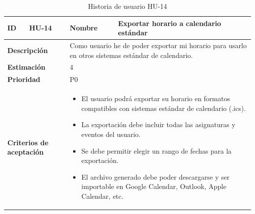 \begin{table}[H]
    \centering
    \begin{tabular}{|p{2cm}|p{4cm}|p{2cm}|p{4cm}|}
        \hline
        \textbf{ID} & HU-14 & \textbf{Nombre} & Exportar horario a calendario estándar \\
        \hline
        \multicolumn{2}{|p{6cm}|}{\textbf{Descripción}} & \multicolumn{2}{p{6cm}|}{Como usuario he de poder exportar mi horario para usarlo en otros sistemas estándar de calendario.} \\
        \hline
        \multicolumn{2}{|p{6cm}|}{\textbf{Estimación}} & \multicolumn{2}{p{6cm}|}{4} \\
        \hline
        \multicolumn{2}{|p{6cm}|}{\textbf{Prioridad}} & \multicolumn{2}{p{6cm}|}{P0} \\
        \hline
        \multicolumn{2}{|p{6cm}|}{\textbf{Criterios de aceptación}} & \multicolumn{2}{p{6cm}|}{
            \begin{itemize}
                \item El usuario podrá exportar su horario en formatos compatibles con sistemas estándar de calendario (.ics).
                \item La exportación debe incluir todas las asignaturas y eventos del usuario.
                \item Se debe permitir elegir un rango de fechas para la exportación.
                \item El archivo generado debe poder descargarse y ser importable en Google Calendar, Outlook, Apple Calendar, etc.
            \end{itemize}
        } \\
        \hline
    \end{tabular}
    \caption{Historia de usuario HU-14}
    \label{tab:hu_14}
\end{table}

